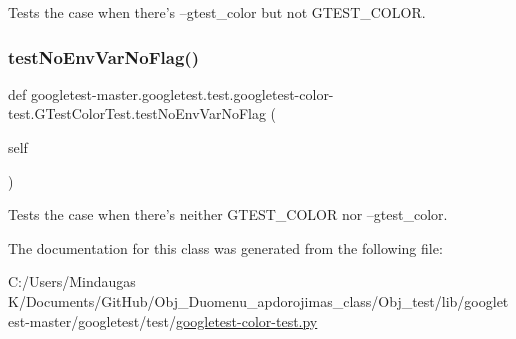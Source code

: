 \begin{DoxyVerb}Tests the case when there's --gtest_color but not GTEST_COLOR.\end{DoxyVerb}
 \mbox{\label{classgoogletest-master_1_1googletest_1_1test_1_1googletest-color-test_1_1_g_test_color_test_acc862a7a8bcc353eaa8929db15ad942b}} 
\subsubsection{\texorpdfstring{testNoEnvVarNoFlag()}{testNoEnvVarNoFlag()}}
{\footnotesize\ttfamily def googletest-\/master.\+googletest.\+test.\+googletest-\/color-\/test.\+G\+Test\+Color\+Test.\+test\+No\+Env\+Var\+No\+Flag (\begin{DoxyParamCaption}\item[{}]{self }\end{DoxyParamCaption})}

\begin{DoxyVerb}Tests the case when there's neither GTEST_COLOR nor --gtest_color.\end{DoxyVerb}
 

The documentation for this class was generated from the following file\+:\begin{DoxyCompactItemize}
\item 
C\+:/\+Users/\+Mindaugas K/\+Documents/\+Git\+Hub/\+Obj\+\_\+\+Duomenu\+\_\+apdorojimas\+\_\+class/\+Obj\+\_\+test/lib/googletest-\/master/googletest/test/\mbox{\hyperlink{_obj__test_2lib_2googletest-master_2googletest_2test_2googletest-color-test_8py}{googletest-\/color-\/test.\+py}}\end{DoxyCompactItemize}
